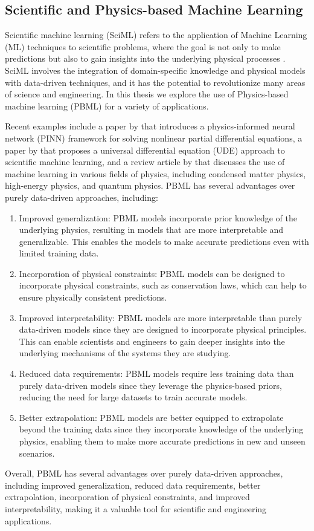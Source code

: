\subsection{Scientific and Physics-based Machine Learning}

Scientific machine learning (SciML) refers to the application of Machine Learning (ML) techniques to scientific problems, where the goal is not only to make predictions but also to gain insights into the underlying physical processes \citep{raissi2019physics, rackauckas2020universal, carleo2019machine}. SciML involves the integration of domain-specific knowledge and physical models with data-driven techniques, and it has the potential to revolutionize many areas of science and engineering. In this thesis we explore the use of Physics-based machine learning (PBML) \citep{Raissi2021, Wu2021} for a variety of applications. 

Recent examples include a paper by \citet{raissi2019physics} that introduces a physics-informed neural network (PINN) framework for solving nonlinear partial differential equations, a paper by \citet{rackauckas2020universal} that proposes a universal differential equation (UDE) approach to scientific machine learning, and a review article by \citet{carleo2019machine} that discusses the use of machine learning in various fields of physics, including condensed matter physics, high-energy physics, and quantum physics. PBML has several advantages over purely data-driven approaches, including:

\begin{enumerate}
    \item Improved generalization: PBML models incorporate prior knowledge of the underlying physics, resulting in models that are more interpretable and generalizable. This enables the models to make accurate predictions even with limited training data.
    \item Incorporation of physical constraints: PBML models can be designed to incorporate physical constraints, such as conservation laws, which can help to ensure physically consistent predictions.
    \item Improved interpretability: PBML models are more interpretable than purely data-driven models since they are designed to incorporate physical principles. This can enable scientists and engineers to gain deeper insights into the underlying mechanisms of the systems they are studying.
    \item Reduced data requirements: PBML models require less training data than purely data-driven models since they leverage the physics-based priors, reducing the need for large datasets to train accurate models.
    \item Better extrapolation: PBML models are better equipped to extrapolate beyond the training data since they incorporate knowledge of the underlying physics, enabling them to make more accurate predictions in new and unseen scenarios.
\end{enumerate}
\noindent Overall, PBML has several advantages over purely data-driven approaches, including improved generalization, reduced data requirements, better extrapolation, incorporation of physical constraints, and improved interpretability, making it a valuable tool for scientific and engineering applications.
